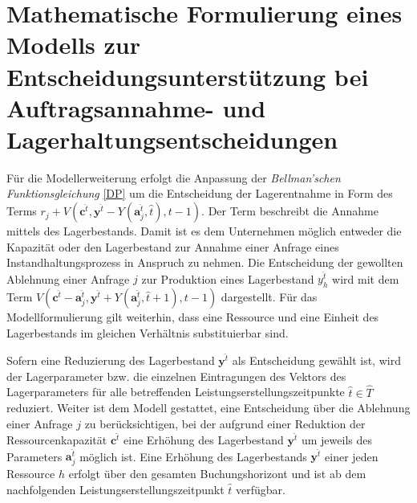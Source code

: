 \section{Mathematische Formulierung eines Modells zur Entscheidungsunterstützung bei Auftragsannahme- und Lagerhaltungsentscheidungen}\label{Umformung}

Für die Modellerweiterung erfolgt die Anpassung der \textit{Bellman'schen Funktionsgleichung}  \eqref{DP} um die Entscheidung der Lagerentnahme in Form des Terms $r_{j} + V(\textbf{c}^{\hat t}, \textbf{y}^{\hat t}-Y(\textbf{a}_j^{\hat t}, \hat t), t-1)$. Der Term beschreibt die Annahme mittels des Lagerbestands. Damit ist es dem Unternehmen möglich entweder die Kapazität oder den Lagerbestand zur Annahme einer Anfrage eines Instandhaltungsprozess in Anspruch zu nehmen. Die Entscheidung der gewollten Ablehnung einer Anfrage $j$ zur Produktion eines Lagerbestand $y_h^{\hat t}$ wird mit dem Term $V(\textbf{c}^{\hat t}-\textbf{a}^{\hat t}_j, \textbf{y}^{\hat t}+Y(\textbf{a}^{\hat t}_j, \hat t +1), t-1)$ dargestellt. Für das Modellformulierung gilt weiterhin, dass eine Ressource und eine Einheit des Lagerbestands im gleichen Verhältnis substituierbar sind.

Sofern eine Reduzierung des Lagerbestand $\textbf{y}^{\hat t}$ als Entscheidung gewählt ist, wird der Lagerparameter bzw. die einzelnen Eintragungen des Vektors des Lagerparameters für alle betreffenden Leistungserstellungszeitpunkte $\hat t\in \hat T$ reduziert. Weiter ist dem Modell gestattet, eine Entscheidung über die Ablehnung einer Anfrage $j$ zu berücksichtigen, bei der aufgrund einer Reduktion der Ressourcenkapazität $\textbf{c}^{\hat t}$ eine Erhöhung des Lagerbestand $\textbf{y}^{\hat t}$ um jeweils des Parameters $\textbf{a}_j^{\hat t}$ möglich ist. Eine Erhöhung des Lagerbestands $\textbf{y}^{\hat t}$ einer jeden Ressource $h$ erfolgt über den gesamten Buchungshorizont und ist ab dem nachfolgenden Leistungserstellungszeitpunkt $\hat t$ verfügbar. %

